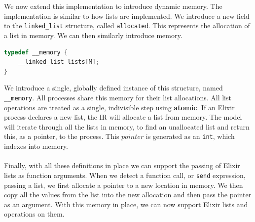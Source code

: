 \\ \\
We now extend this implementation to introduce dynamic memory. The implementation is similar to how lists are implemented. We introduce a new field to the \texttt{linked\_list} structure, called \texttt{allocated}. This represents the allocation of a list in memory. We can then similarly introduce memory.
\begin{lstlisting}[language=C, xleftmargin=.1\linewidth, caption={Memory intermediate representation. Limit of M lists.}]
typedef __memory {
    __linked_list lists[M];
}
\end{lstlisting}
We introduce a single, globally defined instance of this structure, named \texttt{\_\_memory}. All processes share this memory for their list allocations. All list operations are treated as a single, indivisible step using \textbf{atomic}. If an Elixir process declares a new list, the IR will allocate a list from memory. The model will iterate through all the lists in memory, to find an unallocated list and return this, as a pointer, to the process. This $pointer$ is generated as an \texttt{int}, which indexes into memory. 
\\ \\
Finally, with all these definitions in place we can support the passing of Elixir lists as function arguments. When we detect a function call, or \texttt{send} expression, passing a list, we first allocate a pointer to a new location in memory. We then copy all the values from the list into the new allocation and then pass the pointer as an argument. With this memory in place, we can now support Elixir lists and operations on them.
\\ \\
